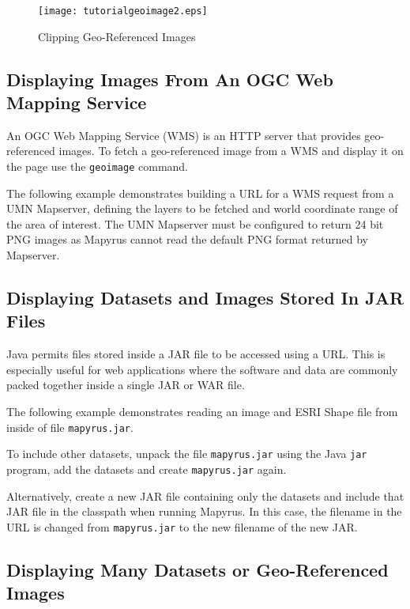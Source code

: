 

\begin{figure}[htb]
\texttt{[image: tutorialgeoimage2.eps]}
\caption{Clipping Geo-Referenced Images}
\label{tutorialgeoimage2}
\end{figure}

\subsection{Displaying Images From An OGC Web Mapping Service}

An OGC Web Mapping Service (WMS) is an HTTP server that provides
geo-referenced images.
To fetch a geo-referenced image from a WMS and display it
on the page use the \texttt{geoimage} command.

The following example demonstrates building a URL for a WMS request
from a UMN Mapserver,
defining the layers to be fetched and world coordinate range
of the area of interest.
The UMN Mapserver must be configured to return 24 bit PNG images
as Mapyrus cannot read the default PNG format returned by Mapserver.



\subsection{Displaying Datasets and Images Stored In JAR Files}

Java permits files stored inside a JAR file to be accessed using a URL.
This is especially useful for web applications where the
software and data are commonly packed together inside a single
JAR or WAR file.

The following example demonstrates reading an image and ESRI
Shape file from inside of file \texttt{mapyrus.jar}.



To include other datasets, unpack the file \texttt{mapyrus.jar}
using the Java \texttt{jar} program, add
the datasets and create \texttt{mapyrus.jar} again.

Alternatively, create a new JAR file containing only the datasets
and include that JAR file in the classpath when running Mapyrus.
In this case, the filename in the URL is changed from \texttt{mapyrus.jar}
to the new filename of the new JAR.

\subsection{Displaying Many Datasets or Geo-Referenced Images}

